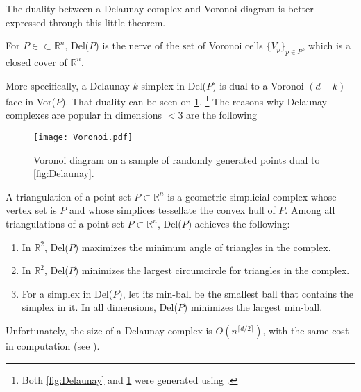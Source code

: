 The duality between a Delaunay complex and Voronoi diagram is better expressed through this little theorem.
\begin{theorem}
  For $P \in \subset \mathbb{R}^{n}$, Del($P$) is the nerve of the set of Voronoi cells $\{V_{p}\}_{p \in P}$, which is a closed cover of $\mathbb{R}^{n}$.
\end{theorem}
More specifically, a Delaunay $k$-simplex in Del($P$) is dual to a Voronoi $(d-k)$-face in Vor($P$). That duality can be seen on \ref{fig:Voronoi}.
\footnote{Both \ref{fig:Delaunay} and \ref{fig:Voronoi} were generated using \cite{2020SciPy-NMeth}.}
The reasons why Delaunay complexes are popular in dimensions $<3$ are the following

\begin{figure}[h!]
  \centering
  \texttt{[image: Voronoi.pdf]}
  \caption{Voronoi diagram on a sample of randomly generated points dual to \ref{fig:Delaunay}.}
  \label{fig:Voronoi}
\end{figure}

\begin{theorem}
  A triangulation of a point set $P \subset \mathbb{R}^{n}$ is a geometric simplicial complex whose vertex set is $P$ and whose simplices tessellate the convex hull of $P$. Among all triangulations of a point set $P \subset \mathbb{R}^{n}$, Del($P$) achieves the following:
  \begin{enumerate}
    \item In $\mathbb{R}^{2}$, Del($P$) maximizes the minimum angle of triangles in the complex.
    \item In $\mathbb{R}^{2}$, Del($P$) minimizes the largest circumcircle for triangles in the complex.
    \item For a simplex in Del($P$), let its min-ball be the smallest ball that contains the simplex in it. In all dimensions, Del($P$) minimizes the largest min-ball.
  \end{enumerate}
\end{theorem}
Unfortunately, the size of a Delaunay complex is $O(n^{\lceil d/2 \rceil})$, with the same cost in computation (see \cite{chazelle1993optimal}).

